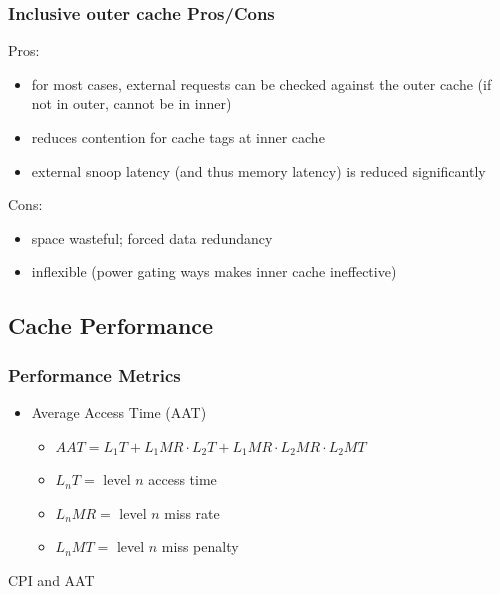 \documentclass[12pt]{extarticle}
\begin{document}
	\subsubsection{Inclusive outer cache Pros/Cons}

	Pros:

	\begin{itemize}
		\item for most cases, external requests can be checked against the outer cache (if not in outer, cannot be in inner)
		\item reduces contention for cache tags at inner cache
		\item external snoop latency (and thus memory latency) is reduced significantly
	\end{itemize}
	
	\noindent Cons:

	\begin{itemize}
		\item space wasteful; forced data redundancy
		\item inflexible (power gating ways makes inner cache ineffective)
	\end{itemize}

	\subsection{Cache Performance}

	\subsubsection{Performance Metrics}

	\begin{itemize}
		\item Average Access Time (AAT)
		\begin{itemize}
			\item $AAT = L_1T + L_1MR \cdot L_2T + L_1MR \cdot L_2MR \cdot L_2MT$
			\item $L_nT =$ level $n$ access time
			\item $L_nMR =$ level $n$ miss rate
			\item $L_nMT =$ level $n$ miss penalty
		\end{itemize}
	\end{itemize}

	\newpage

	\noindent CPI and AAT
\end{document}
